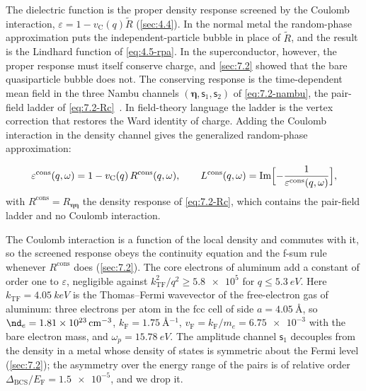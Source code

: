 The dielectric function is the proper density response screened by the Coulomb interaction, $\varepsilon = 1 - v_{\mathrm{C}}(q)\tilde R$ (\cref{sec:4.4}). In the normal metal the random-phase approximation puts the independent-particle bubble in place of $\tilde R$, and the result is the Lindhard function of \cref{eq:4.5-rpa}. In the superconductor, however, the proper response must itself conserve charge, and \cref{sec:7.2} showed that the bare quasiparticle bubble does not. The conserving response is the time-dependent mean field in the three Nambu channels $(\boldsymbol{\eta}, \mathsf{s}_1, \mathsf{s}_2)$ of \cref{eq:7.2-nambu}, the pair-field ladder of \cref{eq:7.2-Rc}~\cite{anderson1958random}. In field-theory language the ladder is the vertex correction that restores the Ward identity of charge. Adding the Coulomb interaction in the density channel gives the generalized random-phase approximation:
\begin{keyresult}
\begin{equation}
  \varepsilon^{\mathrm{cons}}(q,\omega) = 1 - v_{\mathrm{C}}(q)\,R^{\mathrm{cons}}(q,\omega), \qquad
  L^{\mathrm{cons}}(q,\omega) = \operatorname{Im}\Bigl[-\frac{1}{\varepsilon^{\mathrm{cons}}(q,\omega)}\Bigr] ,
  \label{eq:15.1-Lcons}
\end{equation}
with $R^{\mathrm{cons}} = R_{\boldsymbol{\eta}\boldsymbol{\eta}}$ the density response of \cref{eq:7.2-Rc}, which contains the pair-field ladder and no Coulomb interaction.
\end{keyresult}
\noindent The Coulomb interaction is a function of the local density and commutes with it, so the screened response obeys the continuity equation and the f-sum rule whenever $R^{\mathrm{cons}}$ does (\cref{sec:7.2}). The core electrons of aluminum add a constant of order one to $\varepsilon$, negligible against $k_{\mathrm{TF}}^2/q^2 \ge \num{5.8e5}$ for $q \le \SI{5.3}{eV}$. Here $k_{\mathrm{TF}} = \SI{4.05}{keV}$ is the Thomas--Fermi wavevector of the free-electron gas of aluminum: three electrons per atom in the fcc cell of side $a = \SI{4.05}{\angstrom}$, so $\nd_e = \SI{1.81e23}{cm^{-3}}$, $k_{\mathrm{F}} = \SI{1.75}{\angstrom^{-1}}$, $v_{\mathrm{F}} = k_{\mathrm{F}}/m_e = \num{6.75e-3}$ with the bare electron mass, and $\omega_p = \SI{15.78}{eV}$. The amplitude channel $\mathsf{s}_1$ decouples from the density in a metal whose density of states is symmetric about the Fermi level (\cref{sec:7.2}); the asymmetry over the energy range of the pairs is of relative order $\Delta_{\mathrm{BCS}}/E_{\mathrm{F}} = \num{1.5e-5}$, and we drop it.

